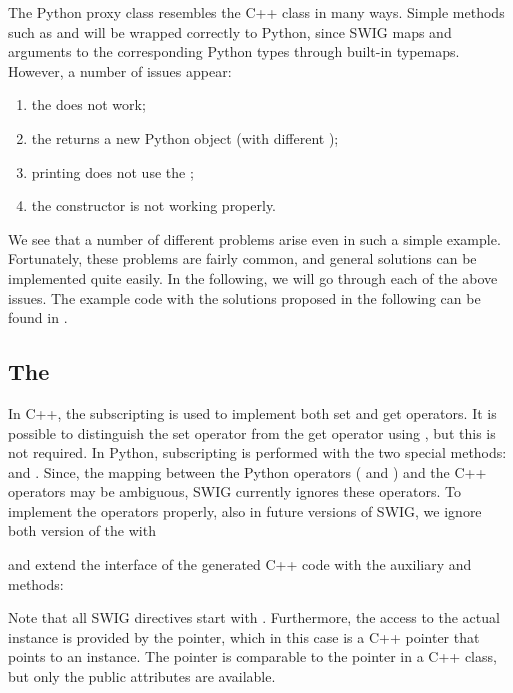 The Python proxy class resembles the C++ class in many ways. Simple
methods such as  and  will be wrapped correctly
to Python, since SWIG maps  and  arguments to the
corresponding Python types through built-in typemaps.  However, a number
of issues appear:
\begin{enumerate}
\item the  does not work;

\item the  returns a new Python object (with different
);

\item printing does not use the ;

\item the  constructor is not working
properly.
\end{enumerate}
We see that a number of different problems arise even in such a simple
example. Fortunately, these problems are fairly common, and general
solutions can be implemented quite easily. In the following, we will go
through each of the above issues. The example code with the solutions
proposed in the following can be found in .

\subsection{The }
In C++, the subscripting  is used to implement
both set and get operators. It is possible to distinguish the set
operator from the get operator using , but this is not
required.  In Python, subscripting is performed with the two special
methods:  and .  Since,
the mapping between the Python operators ( and
) and the C++ operators  may be
ambiguous, SWIG currently ignores these operators.  To implement the
operators properly, also in future versions of SWIG, we ignore both
version of the  with
\begin{swigcode}
\end{swigcode}
and extend the interface of the generated C++ code with the auxiliary
 and  methods:
Note that all SWIG directives start with . Furthermore, the
access to the actual instance is provided by the  pointer,
which in this case is a C++ pointer that points to an 
instance. The pointer is comparable to the  pointer in a C++
class, but only the public attributes are available.

